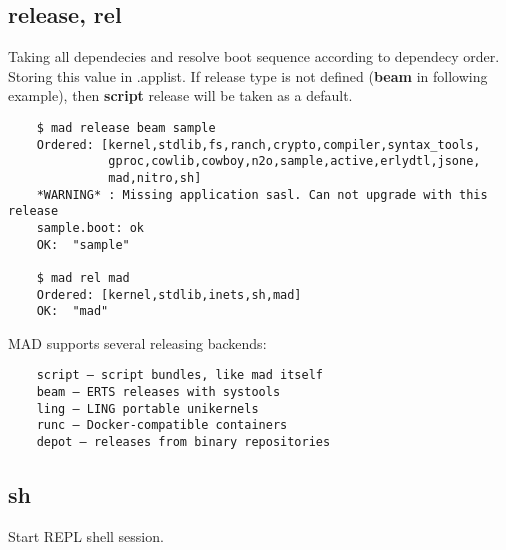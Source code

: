 \subsection{release, rel}
Taking all dependecies and resolve boot sequence according to dependecy order.
Storing this value in .applist. If release type is not defined ({\bf beam} in following example),
then {\bf script} release will be taken as a default.
\vspace{1\baselineskip}
\begin{lstlisting}
    $ mad release beam sample
    Ordered: [kernel,stdlib,fs,ranch,crypto,compiler,syntax_tools,
              gproc,cowlib,cowboy,n2o,sample,active,erlydtl,jsone,
              mad,nitro,sh]
    *WARNING* : Missing application sasl. Can not upgrade with this release
    sample.boot: ok
    OK:  "sample"

    $ mad rel mad
    Ordered: [kernel,stdlib,inets,sh,mad]
    OK:  "mad"
\end{lstlisting}
\vspace{1\baselineskip}

MAD supports several releasing backends:

\vspace{1\baselineskip}
\begin{lstlisting}
    script — script bundles, like mad itself
    beam — ERTS releases with systools
    ling — LING portable unikernels
    runc — Docker-compatible containers
    depot — releases from binary repositories
\end{lstlisting}
\vspace{1\baselineskip}

\subsection{sh}

Start REPL shell session.
